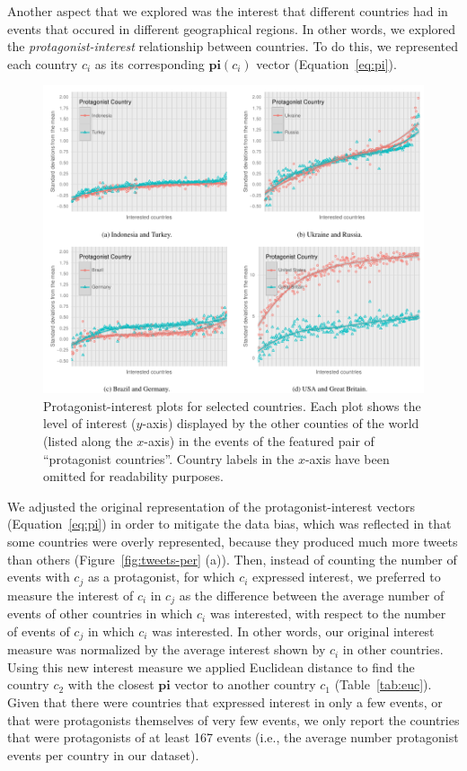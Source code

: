 
Another aspect that we explored was the interest that different countries had in
events that occured in different geographical regions. 
%
In other words, we explored the \emph{protagonist-interest} relationship between
countries. 
%
To do this, we represented each country $c_i$ as its corresponding
$\mathbf{pi}(c_i)$ vector (Equation~\ref{eq:pi}).


\begin{figure}[t]
\centering
\includegraphics[width=\textwidth]{figures/geopolitical/int_prot.pdf}
\caption[Protagonist-interest plots for selected
countries.]{Protagonist-interest plots for selected countries.  Each plot shows
the level of interest ($y$-axis) displayed by the other counties of the world
(listed along the $x$-axis) in the events of the featured pair of ``protagonist
countries''. Country labels in the $x$-axis have been omitted for readability
purposes.}
\label{fig:int-prot}
\end{figure}

We adjusted the original representation of the protagonist-interest vectors
(Equation~\ref{eq:pi}) in order to mitigate the data bias, which was reflected
in that some countries were overly represented, because they produced much more
tweets than others (Figure~\ref{fig:tweets-per} (a)). 
%
Then, instead of counting the number of events with $c_j$ as a protagonist, for
which $c_i$ expressed interest, we preferred to measure the interest of $c_i$ in
$c_j$ as the difference between the average number of events of other countries
in which $c_i$ was interested, with respect to the number of events of $c_j$ in
which $c_i$ was interested. 
%
In other words, our original interest measure was normalized by the average
interest shown by $c_i$ in other countries. 
%
Using this new interest measure we applied Euclidean distance to find the
country $c_2$ with the closest $\mathbf{pi}$ vector to another country $c_1$
(Table~\ref{tab:euc}).
%
Given that there were countries that expressed interest in only a few events, or
that were protagonists themselves of very few events, we only report the
countries that were protagonists of at least 167 events (i.e., the average
number protagonist events per country in our dataset).

